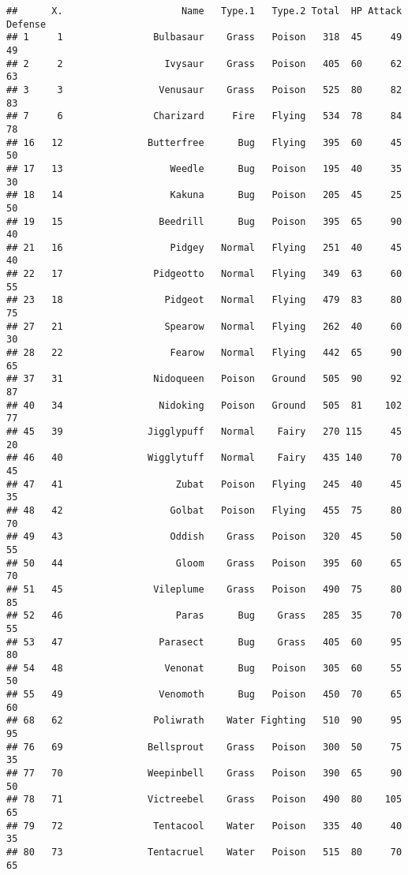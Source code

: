 \documentclass[
]{article}
\begin{document}
\begin{verbatim}
##      X.                     Name   Type.1   Type.2 Total  HP Attack Defense
## 1     1                Bulbasaur    Grass   Poison   318  45     49      49
## 2     2                  Ivysaur    Grass   Poison   405  60     62      63
## 3     3                 Venusaur    Grass   Poison   525  80     82      83
## 7     6                Charizard     Fire   Flying   534  78     84      78
## 16   12               Butterfree      Bug   Flying   395  60     45      50
## 17   13                   Weedle      Bug   Poison   195  40     35      30
## 18   14                   Kakuna      Bug   Poison   205  45     25      50
## 19   15                 Beedrill      Bug   Poison   395  65     90      40
## 21   16                   Pidgey   Normal   Flying   251  40     45      40
## 22   17                Pidgeotto   Normal   Flying   349  63     60      55
## 23   18                  Pidgeot   Normal   Flying   479  83     80      75
## 27   21                  Spearow   Normal   Flying   262  40     60      30
## 28   22                   Fearow   Normal   Flying   442  65     90      65
## 37   31                Nidoqueen   Poison   Ground   505  90     92      87
## 40   34                 Nidoking   Poison   Ground   505  81    102      77
## 45   39               Jigglypuff   Normal    Fairy   270 115     45      20
## 46   40               Wigglytuff   Normal    Fairy   435 140     70      45
## 47   41                    Zubat   Poison   Flying   245  40     45      35
## 48   42                   Golbat   Poison   Flying   455  75     80      70
## 49   43                   Oddish    Grass   Poison   320  45     50      55
## 50   44                    Gloom    Grass   Poison   395  60     65      70
## 51   45                Vileplume    Grass   Poison   490  75     80      85
## 52   46                    Paras      Bug    Grass   285  35     70      55
## 53   47                 Parasect      Bug    Grass   405  60     95      80
## 54   48                  Venonat      Bug   Poison   305  60     55      50
## 55   49                 Venomoth      Bug   Poison   450  70     65      60
## 68   62                Poliwrath    Water Fighting   510  90     95      95
## 76   69               Bellsprout    Grass   Poison   300  50     75      35
## 77   70               Weepinbell    Grass   Poison   390  65     90      50
## 78   71               Victreebel    Grass   Poison   490  80    105      65
## 79   72                Tentacool    Water   Poison   335  40     40      35
## 80   73               Tentacruel    Water   Poison   515  80     70      65

\end{verbatim}
\end{document}
